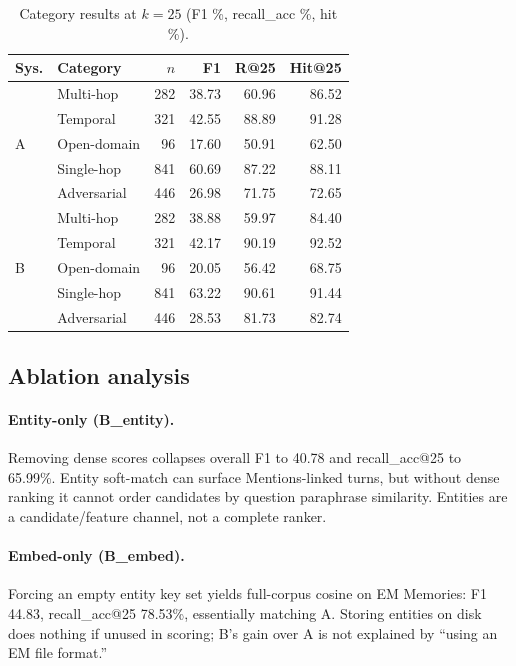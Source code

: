 \documentclass[11pt]{article}
\begin{document}
\begin{table}[t]
\centering
\small
\caption{Category results at $k{=}25$ (F1 \%, recall\_acc \%, hit \%).}
\label{tab:cat}
\begin{tabular}{llrrrr}
\toprule
Sys. & Category & $n$ & F1 & R@25 & Hit@25 \\
\midrule
\multirow{5}{*}{A}
 & Multi-hop & 282 & 38.73 & 60.96 & 86.52 \\
 & Temporal & 321 & 42.55 & 88.89 & 91.28 \\
 & Open-domain & 96 & 17.60 & 50.91 & 62.50 \\
 & Single-hop & 841 & 60.69 & 87.22 & 88.11 \\
 & Adversarial & 446 & 26.98 & 71.75 & 72.65 \\
\midrule
\multirow{5}{*}{B}
 & Multi-hop & 282 & 38.88 & 59.97 & 84.40 \\
 & Temporal & 321 & 42.17 & 90.19 & 92.52 \\
 & Open-domain & 96 & 20.05 & 56.42 & 68.75 \\
 & Single-hop & 841 & 63.22 & 90.61 & 91.44 \\
 & Adversarial & 446 & 28.53 & 81.73 & 82.74 \\
\bottomrule
\end{tabular}
\end{table}

\subsection{Ablation analysis}
\label{sec:ablation}

\paragraph{Entity-only (B\_entity).}
Removing dense scores collapses overall F1 to 40.78 and recall\_acc@25 to 65.99\%.
Entity soft-match can surface Mentions-linked turns, but without dense ranking it cannot order candidates by question paraphrase similarity.
Entities are a candidate/feature channel, not a complete ranker.

\paragraph{Embed-only (B\_embed).}
Forcing an empty entity key set yields full-corpus cosine on EM Memories: F1 44.83, recall\_acc@25 78.53\%, essentially matching A.
Storing entities on disk does nothing if unused in scoring; B's gain over A is not explained by ``using an EM file format.''
\end{document}
